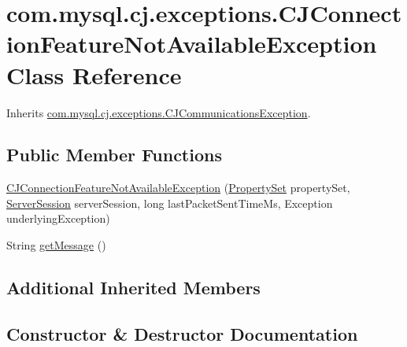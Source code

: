 \hypertarget{classcom_1_1mysql_1_1cj_1_1exceptions_1_1_c_j_connection_feature_not_available_exception}{}\section{com.\+mysql.\+cj.\+exceptions.\+C\+J\+Connection\+Feature\+Not\+Available\+Exception Class Reference}
\label{classcom_1_1mysql_1_1cj_1_1exceptions_1_1_c_j_connection_feature_not_available_exception}


Inherits \mbox{\hyperlink{classcom_1_1mysql_1_1cj_1_1exceptions_1_1_c_j_communications_exception}{com.\+mysql.\+cj.\+exceptions.\+C\+J\+Communications\+Exception}}.

\subsection*{Public Member Functions}
\begin{DoxyCompactItemize}
\item 
\mbox{\hyperlink{classcom_1_1mysql_1_1cj_1_1exceptions_1_1_c_j_connection_feature_not_available_exception_a38bd9b47e94da5285884a4b062f6731a}{C\+J\+Connection\+Feature\+Not\+Available\+Exception}} (\mbox{\hyperlink{interfacecom_1_1mysql_1_1cj_1_1conf_1_1_property_set}{Property\+Set}} property\+Set, \mbox{\hyperlink{interfacecom_1_1mysql_1_1cj_1_1protocol_1_1_server_session}{Server\+Session}} server\+Session, long last\+Packet\+Sent\+Time\+Ms, Exception underlying\+Exception)
\item 
String \mbox{\hyperlink{classcom_1_1mysql_1_1cj_1_1exceptions_1_1_c_j_connection_feature_not_available_exception_a9e98c1e92dcc3ff64199f23d3b68755c}{get\+Message}} ()
\end{DoxyCompactItemize}
\subsection*{Additional Inherited Members}


\subsection{Constructor \& Destructor Documentation}
\mbox{\label{classcom_1_1mysql_1_1cj_1_1exceptions_1_1_c_j_connection_feature_not_available_exception_a38bd9b47e94da5285884a4b062f6731a}} 
